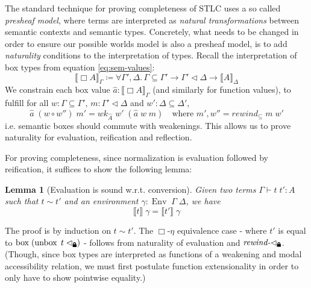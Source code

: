 \documentclass[12pt,twoside,openright]{report}
\numberwithin{equation}{chapter}
\numberwithin{figure}{chapter}
\numberwithin{table}{chapter}
\newtheorem{lemma}[theorem]{Lemma}
\theoremstyle{definition}\newtheorem{definition}{Definition}
\newcommand{\lock}{\text{\tikz[baseline]{
      \fill[rounded corners=.1ex] (-.75ex,0) rectangle (.75ex,1ex);
      \draw[line width=.3ex] (-.4ex,.5ex) -- ++(0,.75ex) arc (180:0:.4ex) -- ++(0,-.75ex);
}}}
\begin{document}
The standard technique for proving completeness of STLC \cite{altenkirch95,kovacs17}
uses a so called \emph{presheaf model},
where terms are interpreted as \emph{natural transformations}
between semantic contexts and semantic types.
Concretely, what needs to be changed in order to ensure
our possible worlds model is also a presheaf model,
is to add \emph{naturality} conditions to the interpretation of types.
Recall the interpretation of box types from equation \eqref{eq:sem-values}:
$$ \llbracket \Box A \rrbracket_\Gamma \coloneqq \forall \Gamma', \Delta. \, \Gamma \subseteq \Gamma' \to \Gamma'\lhd\Delta \to \llbracket A \rrbracket_\Delta $$
We constrain each box value $\hat a : \llbracket \Box A \rrbracket_\Gamma$
(and similarly for function values),
to fulfill for all $w : \Gamma \subseteq \Gamma'$, $m : \Gamma' \lhd \Delta$ and $w' : \Delta \subseteq \Delta'$,
$$ \hat a \; (w \circ w'') \; m' = \textit{wk}_{\widehat A} \; w' \; (\hat a \; w \; m) \quad \text{where } m' , w'' = \textit{rewind}_\subseteq \; m \; w' $$
i.e. semantic boxes should commute with weakenings.
This allows us to prove naturality for evaluation, reification and reflection.

For proving completeness, since normalization is evaluation followed by reification,
it suffices to show the following lemma:
\begin{lemma}[Evaluation is sound w.r.t. conversion]
  Given two terms $\Gamma \vdash t \; t' : A$ such that $t \sim t'$
  and an environment $\gamma : \operatorname{Env} \; \Gamma \; \Delta$,
  we have
  $$ \llbracket t \rrbracket \; \gamma = \llbracket t' \rrbracket \; \gamma $$
\end{lemma}
The proof is by induction on $t \sim t'$.
The $\Box\text{-}\eta$ equivalence case -
where $t'$ is equal to $\operatorname{box} \; (\operatorname{unbox} \; t \; \lhd_\lock)$ -
follows from naturality of evaluation and $\textit{rewind-}\lhd_\lock$.
(Though, since box types are interpreted as functions
of a weakening and modal accessibility relation,
we must first postulate function extensionality
in order to only have to show pointwise equality.)
\end{document}
